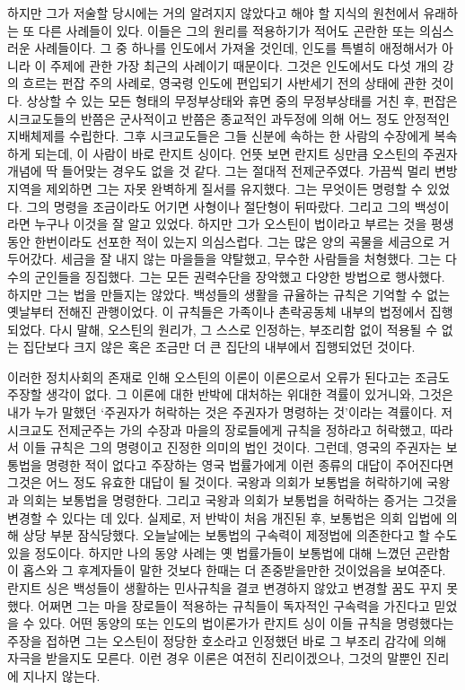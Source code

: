 하지만 
그가 저술할 당시에는 거의 알려지지 않았다고 해야 할 지식의 원천에서 유래하는
또 다른 사례들이 있다.
이들은 그의 원리를 적용하기가 적어도 곤란한 또는 의심스러운 사례들이다.
그 중 하나를 인도에서 가져올 것인데,
인도를 특별히 애정해서가 아니라
이 주제에 관한 가장 최근의 사례이기 때문이다.
그것은 인도에서도
다섯 개의 강의 흐르는
펀잡 주의 사례로,
영국령 인도에 편입되기 사반세기 전의 상태에 관한 것이다.
상상할 수 있는 모든 형태의 무정부상태와 휴면 중의 무정부상태를 거친 후,
펀잡은
시크교도들의
반쯤은 군사적이고 반쯤은 종교적인
과두정에 의해 어느 정도 안정적인 지배체제를 수립한다.
그후 시크교도들은 그들 신분에 속하는 한 사람의 수장에게
복속하게 되는데, 이 사람이 바로 란지트 싱이다.
언뜻 보면 란지트 싱만큼 오스틴의 주권자 개념에
딱 들어맞는 경우도 없을 것 같다.
그는 절대적 전제군주였다.
가끔씩 멀리 변방 지역을 제외하면 그는 자못 완벽하게 질서를 유지했다.
그는 무엇이든 명령할 수 있었다.
그의 명령을 조금이라도 어기면 사형이나 절단형이 뒤따랐다.
그리고 그의 백성이라면 누구나 이것을 잘 알고 있었다.
하지만 그가 오스틴이 법이라고 부르는 것을 평생동안 한번이라도
선포한 적이 있는지 의심스럽다.
그는 많은 양의 곡물을 세금으로 거두어갔다.
세금을 잘 내지 않는 마을들을 약탈했고, 무수한 사람들을 처형했다.
그는 다수의 군인들을 징집했다.
그는 모든 권력수단을 장악했고 다양한 방법으로 행사했다.
하지만 그는 법을 만들지는 않았다.
백성들의 생활을 규율하는 규칙은
기억할 수 없는 옛날부터 전해진 관행이었다.
이 규칙들은 가족이나 촌락공동체 내부의 법정에서 집행되었다.
다시 말해,
오스틴의 원리가, 그 스스로 인정하는, 부조리함 없이 적용될 수 없는 집단보다
크지 않은 혹은 조금만 더 큰 집단의 내부에서 집행되었던 것이다.

이러한 정치사회의 존재로 인해 오스틴의 이론이 이론으로서 오류가 된다고는
조금도 주장할 생각이 없다.
그 이론에 대한 반박에 대처하는 위대한 격률이 있거니와,
그것은 내가 누가 말했던 `주권자가 허락하는 것은 주권자가 명령하는 것'이라는
격률이다.
저 시크교도 전제군주는 가의 수장과 마을의 장로들에게
규칙을 정하라고 허락했고, 따라서
이들 규칙은 그의 명령이고 진정한 의미의 법인 것이다.
그런데,
영국의 주권자는 보통법을 명령한 적이 없다고 주장하는
영국 법률가에게
이런 종류의 대답이
주어진다면 그것은 어느 정도 유효한 대답이 될 것이다.
국왕과 의회가 보통법을 허락하기에 국왕과 의회는 보통법을 명령한다.
그리고 국왕과 의회가 보통법을 허락하는 증거는 그것을 변경할 수 있다는 데 있다.
실제로, 저 반박이 처음 개진된 후,
보통법은 의회 입법에 의해 상당 부분 잠식당했다.
오늘날에는 보통법의 구속력이 제정법에 의존한다고 할 수도 있을 정도이다.
하지만 나의 동양 사례는
옛 법률가들이 보통법에 대해 느꼈던 곤란함이
홉스와 그 후계자들이 말한 것보다 한때는 더 존중받을만한 것이었음을 보여준다.
란지트 싱은 백성들이 생활하는 민사규칙을 결코 변경하지 않았고
변경할 꿈도 꾸지 못했다.
어쩌면 그는 마을 장로들이 적용하는 규칙들이
독자적인 구속력을 가진다고 믿었을 수 있다.
어떤 동양의 또는 인도의 법이론가가
란지트 싱이 이들 규칙을 명령했다는 주장을 접하면
그는 오스틴이 정당한 호소라고 인정했던 바로 그 부조리 감각에 의해
자극을 받을지도 모른다.
이런 경우 이론은 여전히 진리이겠으나,
그것의 말뿐인 진리에 지나지 않는다.

